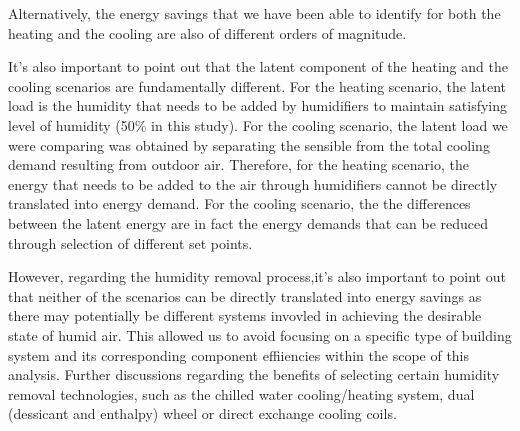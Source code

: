 
Alternatively, the energy savings that we have been able to identify for both the heating and the cooling are also of different orders of magnitude. 

It's also important to point out that the latent component of the heating and the cooling scenarios are fundamentally different. For the heating scenario, the latent load is the humidity that needs to be added by humidifiers to maintain satisfying level of humidity (50\% in this study). For the cooling scenario, the latent load we were comparing was obtained by separating the sensible from the total cooling demand resulting from outdoor air. Therefore, for the heating scenario, the energy that needs to be added to the air through humidifiers cannot be directly translated into energy demand. For the cooling scenario, the the differences between the latent energy are in fact the energy demands that can be reduced through selection of different set points.

However, regarding the humidity removal process,it's also important to point out that neither of the scenarios can be directly translated into energy savings as there may potentially be different systems invovled in achieving the desirable state of humid air. This allowed us to avoid focusing on a specific type of building system and its corresponding component effiiencies within the scope of this analysis. Further discussions regarding the benefits of selecting certain humidity removal technologies, such as the chilled water cooling/heating system, dual (dessicant and enthalpy) wheel or direct exchange cooling coils.
